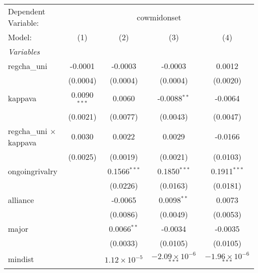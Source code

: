 \begingroup
\centering
\begin{tabular}{lcccc}
   \tabularnewline \midrule \midrule
   Dependent Variable: & \multicolumn{4}{c}{cowmidonset}\\
   Model:                                & (1)            & (2)                     & (3)                            & (4)\\  
   \midrule
   \emph{Variables}\\
   regcha\_uni                           & -0.0001        & -0.0003                 & -0.0003                        & 0.0012\\   
                                         & (0.0004)       & (0.0004)                & (0.0004)                       & (0.0020)\\   
   kappava                               & 0.0090$^{***}$ & 0.0060                  & -0.0088$^{**}$                 & -0.0064\\   
                                         & (0.0021)       & (0.0077)                & (0.0043)                       & (0.0047)\\   
   regcha\_uni $\times$ kappava          & 0.0030         & 0.0022                  & 0.0029                         & -0.0166\\   
                                         & (0.0025)       & (0.0019)                & (0.0021)                       & (0.0103)\\   
   ongoingrivalry                        &                & 0.1566$^{***}$          & 0.1850$^{***}$                 & 0.1911$^{***}$\\   
                                         &                & (0.0226)                & (0.0163)                       & (0.0181)\\   
   alliance                              &                & -0.0065                 & 0.0098$^{**}$                  & 0.0073\\   
                                         &                & (0.0086)                & (0.0049)                       & (0.0053)\\   
   major                                 &                & 0.0066$^{**}$           & -0.0034                        & -0.0035\\   
                                         &                & (0.0033)                & (0.0105)                       & (0.0105)\\   
   mindist                               &                & $1.12\times 10^{-5}$    & $-2.09\times 10^{-6}$$^{***}$  & $-1.96\times 10^{-6}$$^{***}$\\    

\end{tabular}
